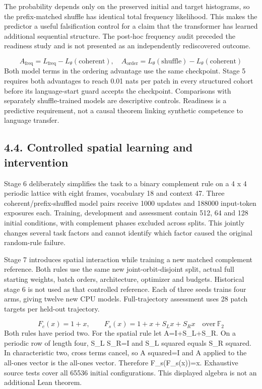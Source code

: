 \documentclass[11pt,a4paper]{article}
\begin{document}
The probability depends only on the preserved initial and target histograms, so the prefix-matched shuffle has identical total frequency likelihood. This makes the predictor a useful falsification control for a claim that the transformer has learned additional sequential structure. The post-hoc frequency audit preceded the readiness study and is not presented as an independently rediscovered outcome.

\begin{equation}
A_{\mathrm{freq}}=L_{\mathrm{freq}}-L_\theta(\mathrm{coherent}),\quad A_{\mathrm{order}}=L_\theta(\mathrm{shuffle})-L_\theta(\mathrm{coherent})
\end{equation}
Both model terms in the ordering advantage use the same checkpoint. Stage 5 requires both advantages to reach 0.01 nats per patch in every structured cohort before its language-start guard accepts the checkpoint. Comparisons with separately shuffle-trained models are descriptive controls. Readiness is a predictive requirement, not a causal theorem linking synthetic competence to language transfer.

\subsection*{4.4. Controlled spatial learning and intervention}
Stage 6 deliberately simplifies the task to a binary complement rule on a 4 x 4 periodic lattice with eight frames, vocabulary 18 and context 47. Three coherent/\allowbreak{}prefix-shuffled model pairs receive 1000 updates and 188000 input-token exposures each. Training, development and assessment contain 512, 64 and 128 initial conditions, with complement phases excluded across splits. This jointly changes several task factors and cannot identify which factor caused the original random-rule failure.

Stage 7 introduces spatial interaction while training a new matched complement reference. Both rules use the same new joint-orbit-disjoint split, actual full starting weights, batch orders, architecture, optimizer and budgets. Historical stage 6 is not used as that controlled reference. Each of three seeds trains four arms, giving twelve new CPU models. Full-trajectory assessment uses 28 patch targets per held-out trajectory.

\begin{equation}
F_c(x)=1+x,\qquad F_s(x)=1+x+S_Lx+S_Rx\quad\mathrm{over}\ \mathbb{F}_2
\end{equation}
Both rules have period two. For the spatial rule let A=I+S\_\allowbreak{}L+S\_\allowbreak{}R. On a periodic row of length four, S\_\allowbreak{}L S\_\allowbreak{}R=I and S\_\allowbreak{}L squared equals S\_\allowbreak{}R squared. In characteristic two, cross terms cancel, so A squared=I and A applied to the all-ones vector is the all-ones vector. Therefore F\_\allowbreak{}s(F\_\allowbreak{}s(x))=x. Exhaustive source tests cover all 65536 initial configurations. This displayed algebra is not an additional Lean theorem.
\end{document}
